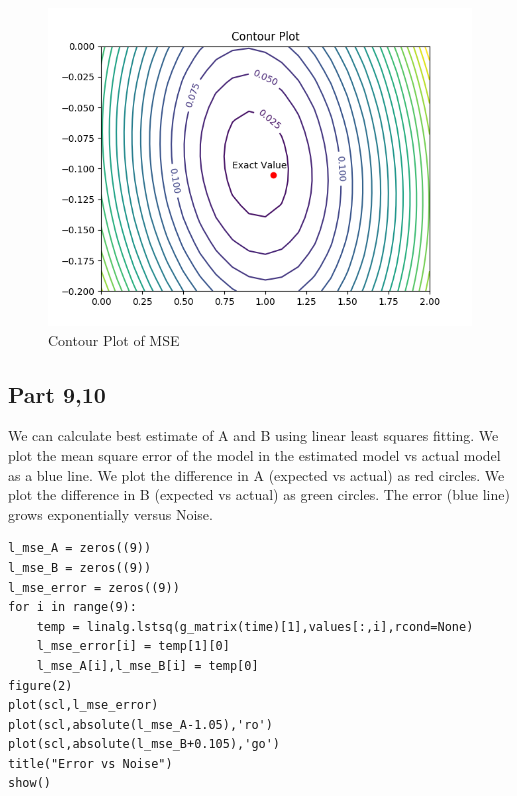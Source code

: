 \documentclass[11pt, a4paper]{article}
\begin{document}
\begin{figure}[!tbh]
   	\centering
   	\includegraphics[scale=0.5]{Assignment_3_Qn8.png}
   	\caption{Contour Plot of MSE}
   	\label{fig:sample}
   \end{figure}


 \subsection{Part 9,10}
 We can calculate best estimate of A and B using linear least squares fitting.
 We plot the mean square error of the model in the estimated model vs actual model as a blue line.
 We plot the difference in A (expected vs actual) as red circles.
 We plot the difference in B (expected vs actual) as green circles.
 The error (blue line) grows exponentially versus Noise.
 \begin{verbatim}
l_mse_A = zeros((9))
l_mse_B = zeros((9))
l_mse_error = zeros((9))
for i in range(9):
	temp = linalg.lstsq(g_matrix(time)[1],values[:,i],rcond=None)
	l_mse_error[i] = temp[1][0]
	l_mse_A[i],l_mse_B[i] = temp[0]
figure(2)
plot(scl,l_mse_error)
plot(scl,absolute(l_mse_A-1.05),'ro')
plot(scl,absolute(l_mse_B+0.105),'go')
title("Error vs Noise")
show()
\end{verbatim}
\end{document}
